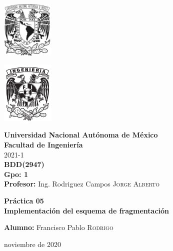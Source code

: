 \documentclass{article}
\newcommand{\materia}{BDD}
\newcommand{\clave}{2947}
\newcommand{\profesor}{Ing. Rodriguez Campos \textsc{Jorge Alberto}}
\newcommand{\semestre}{2021-1}
\newcommand{\alumno}{Francisco Pablo \textsc{Rodrigo}}
\newcommand{\actividad}{Práctica 05}
\newcommand{\titulo}{Implementación del esquema de fragmentación}
\newcommand{\fechaEntrega}{noviembre de 2020}
\begin{document}
\thispagestyle{empty}
\begin{minipage}[t][5cm][t]{0.2\linewidth}
    \includegraphics[width=2.5cm]{unam.jpg}
    \vspace{10cm}

    \includegraphics[width=2.5cm]{fiblack}
\end{minipage}
\begin{minipage}[t]{0.7\linewidth}
    \vspace{-2.5cm}
    \LARGE{\textbf{Universidad Nacional Autónoma de México}}\\
    \Large{\textbf{Facultad de Ingeniería}} \\

    \large{\semestre}\\[2cm]

    \large{\textbf{\materia (\clave)}}\\
    \large{\textbf{Gpo: 1}}\\[5mm]
    \large{\textbf{Profesor:} \profesor}\\ [1.5cm]
    \begin{center}
        \LARGE{\textbf{\actividad}}\\
        \LARGE{\textbf{\titulo}}\\
    \end{center}

    \vspace{3.3cm}

    \large{\textbf{Alumno:} \alumno} \\[1.5cm]

    \begin{flushright}
        \fechaEntrega%
    \end{flushright}
\end{minipage}

\newpage
\end{document}

